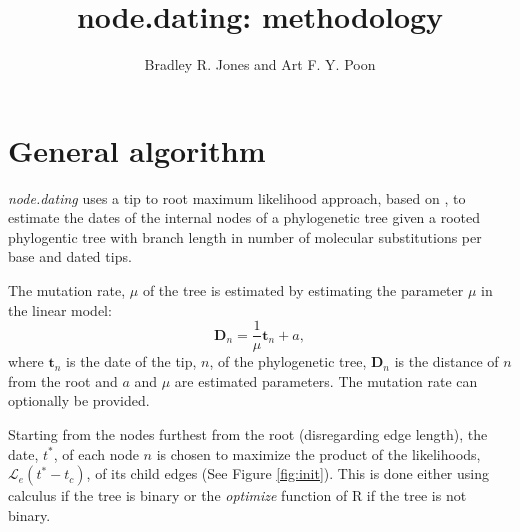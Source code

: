 \documentclass[12pt]{article}
\title{node.dating: methodology}
\author{Bradley R. Jones and Art F. Y. Poon}
\newcommand{\code}[1]{\emph{#1}}
\begin{document}
	\maketitle
	
	\section{General algorithm}	
		\code{node.dating} uses a tip to root maximum likelihood approach, based on \cite{Felsenstein81, TipDates}, to estimate the dates of the internal nodes of a phylogenetic tree given a rooted phylogentic tree with branch length in number of molecular substitutions per base and dated tips.
		
		The mutation rate, $\mu$ of the tree is estimated by estimating the parameter $\mu$ in the linear model:
		\[\mathbf{D}_n = \frac{1}{\mu}\mathbf{t}_n + a,\]
		where $\mathbf{t}_n$ is the date of the tip, $n$, of the phylogenetic tree, $\mathbf{D}_n$ is the distance of $n$ from the root and $a$ and $\mu$ are estimated parameters.
		The mutation rate can optionally be provided.
		
		Starting from the nodes furthest from the root (disregarding edge length), the date, $t^*$, of each node $n$ is chosen to maximize the product of the likelihoods, $\mathcal{L}_e(t^* - t_c)$, of its child edges (See Figure  \ref{fig:init}). This is done either using calculus if the tree is binary or the \code{optimize} function of R if the tree is not binary.
		
\end{document}
